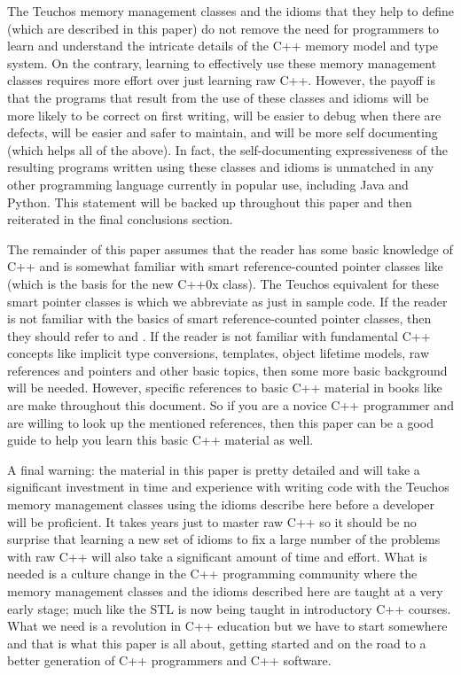 \documentclass[pdf,ps2pdf,11pt]{SANDreport}
\begin{document}
The Teuchos memory management classes and the idioms that they help to
define (which are described in this paper) do not remove the need for
programmers to learn and understand the intricate details of the C++
memory model and type system.  On the contrary, learning to
effectively use these memory management classes requires more effort
over just learning raw C++.  However, the payoff is that the programs
that result from the use of these classes and idioms will be more
likely to be correct on first writing, will be easier to debug when
there are defects, will be easier and safer to maintain, and will be
more self documenting (which helps all of the above).  In fact, the
self-documenting expressiveness of the resulting programs written
using these classes and idioms is unmatched in any other programming
language currently in popular use, including Java and Python.  This
statement will be backed up throughout this paper and then reiterated
in the final conclusions section.

The remainder of this paper assumes that the reader has some basic
knowledge of C++ and is somewhat familiar with smart reference-counted
pointer classes like {} (which is the basis
for the new C++0x {} class).  The Teuchos
equivalent for these smart pointer classes is {}
which we abbreviate as just {} in sample code.  If the
reader is not familiar with the basics of smart reference-counted
pointer classes, then they should refer to
{}\cite{RefCountPtrBeginnersGuide} and {}\cite{C++CodingStandards05}.
If the reader is not familiar with fundamental C++ concepts like
implicit type conversions, templates, object lifetime models, raw
references and pointers and other basic topics, then some more basic
background will be needed.  However, specific references to basic C++
material in books like {}\cite{EffectiveC++ThirdEdition, stroustrup97,
C++CodingStandards05} are make throughout this document.  So if you
are a novice C++ programmer and are willing to look up the mentioned
references, then this paper can be a good guide to help you learn this
basic C++ material as well.

A final warning: the material in this paper is pretty detailed and
will take a significant investment in time and experience with writing
code with the Teuchos memory management classes using the idioms
describe here before a developer will be proficient.  It takes years
just to master raw C++ so it should be no surprise that learning a new
set of idioms to fix a large number of the problems with raw C++ will
also take a significant amount of time and effort.  What is needed is
a culture change in the C++ programming community where the memory
management classes and the idioms described here are taught at a very
early stage; much like the STL is now being taught in introductory C++
courses.  What we need is a revolution in C++ education but we have to
start somewhere and that is what this paper is all about, getting
started and on the road to a better generation of C++ programmers and
C++ software.
\end{document}
